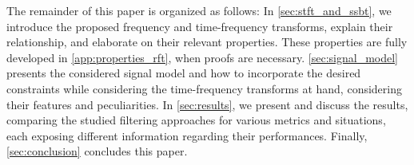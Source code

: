 
The remainder of this paper is organized as follows: In \cref{sec:stft_and_ssbt}, we introduce the proposed frequency and time-frequency transforms, explain their relationship, and elaborate on their relevant properties. These properties are fully developed in \cref{app:properties_rft}, when proofs are necessary.
\cref{sec:signal_model} presents the considered signal model and how to incorporate the desired constraints while considering the time-frequency transforms at hand, considering their features and peculiarities.
In \cref{sec:results}, we present and discuss the results, comparing the studied filtering approaches for various metrics and situations, each exposing different information regarding their performances.
Finally, \cref{sec:conclusion} concludes this paper.

